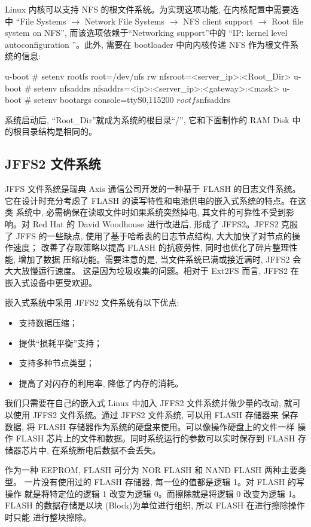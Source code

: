 Linux 内核可以支持 NFS 的根文件系统。为实现这项功能, 在内核配置中需要选中
``File Systems $\to$ Network File Systems $\to$  NFS client support  $\to$
 Root file system on NFS'', 而该选项依赖于``Networking support''中的
``IP: kernel level autoconfiguration ''。此外, 需要在 bootloader 中向内核传递
NFS 作为根文件系统的信息:

\begin{blockcode}
u-boot # setenv rootfs root=/dev/nfs rw nfsroot=<server_ip>:<Root_Dir>
u-boot # setenv nfsaddrs nfsaddrs=<ip>:<server_ip>:<gateway>:<mask>
u-boot # setenv bootargs console=ttyS0,115200 $rootfs $nfsaddrs
\end{blockcode}

系统启动后, ``Root\_Dir''就成为系统的根目录``/'', 它和下面制作的
RAM Disk 中的根目录结构是相同的。

\subsection{JFFS2 文件系统}
	JFFS 文件系统是瑞典 Axis 通信公司开发的一种基于 FLASH 的日志文件系统。
它在设计时充分考虑了 FLASH 的读写特性和电池供电的嵌入式系统的特点。在这类
系统中, 必需确保在读取文件时如果系统突然掉电, 其文件的可靠性不受到影响。对
Red Hat 的 David Woodhouse 进行改进后, 形成了 JFFS2。JFFS2 克服了 JFFS
的一些缺点, 使用了基于哈希表的日志节点结构, 大大加快了对节点的操作速度；
改善了存取策略以提高 FLASH 的抗疲劳性, 同时也优化了碎片整理性能, 增加了数据
压缩功能。需要注意的是, 当文件系统已满或接近满时, JFFS2 会大大放慢运行速度。
这是因为垃圾收集的问题。相对于 Ext2FS 而言, JFFS2 在嵌入式设备中更受欢迎。

嵌入式系统中采用 JFFS2 文件系统有以下优点:
\begin{itemize}
    \item 支持数据压缩；
    \item 提供``损耗平衡''支持；
    \item 支持多种节点类型；
    \item 提高了对闪存的利用率, 降低了内存的消耗。
\end{itemize}

我们只需要在自己的嵌入式 Linux 中加入 JFFS2 文件系统并做少量的改动,
就可以使用 JFFS2 文件系统。通过 JFFS2 文件系统, 可以用 FLASH 存储器来
保存数据, 将 FLASH 存储器作为系统的硬盘来使用。可以像操作硬盘上的文件一样
操作 FLASH 芯片上的文件和数据。同时系统运行的参数可以实时保存到 FLASH
存储器芯片中, 在系统断电后数据不会丢失。

作为一种 EEPROM, FLASH 可分为 NOR FLASH 和 NAND FLASH 两种主要类型。
一片没有使用过的 FLASH 存储器, 每一位的值都是逻辑 1。对 FLASH 的写操作
就是将特定位的逻辑 1 改变为逻辑 0。而擦除就是将逻辑 0 改变为逻辑 1。FLASH
的数据存储是以块 (Block)为单位进行组织, 所以 FLASH 在进行擦除操作时只能
进行整块擦除。

